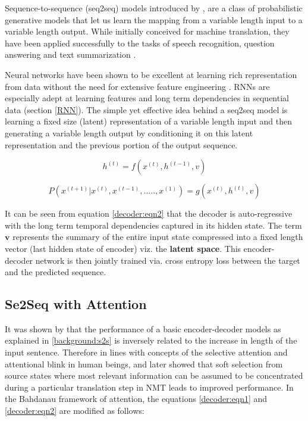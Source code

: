 Sequence-to-sequence (seq2seq) models introduced by \cite{Sutskever2014}, \cite{GRU} are a class of probabilistic generative models that let us learn the mapping from a variable length input to a variable length output. While initially conceived for machine translation, they have been applied successfully to the tasks of speech recognition, question answering and text summarization \citep{Vinyals2015} \citep{anderson2018bottom} \citep{lu2017knowing}.

Neural networks have been shown to be excellent at learning rich representation from data without the need for extensive feature engineering \citep{Hinton2006}. RNNs are especially adept at learning features and long term dependencies in sequential data (section \ref{RNN}). The simple yet effective idea behind a seq2seq model is learning a fixed size (latent) representation of a variable length input and then generating a variable length output by conditioning it on this latent representation and the previous portion of the output sequence.

\begin{equation} \label{decoder:eqn1}
	h^{(t)} = f(x^{(t)}, h^{(t-1)}, v)
\end{equation}

\begin{equation} \label{decoder:eqn2}
	P(x^{(t+1)}|x^{(t)}, x^{(t-1)},.....,x^{(1)}) = g(x^{(t)}, h^{(t)}, v)
\end{equation}

It can be seen from equation \ref{decoder:eqn2} that the decoder is auto-regressive with the long term temporal dependencies captured in its hidden state. The term $\mathbf{v}$ represents the summary of the entire input state compressed into a fixed length vector (last hidden state of encoder) viz. the \textbf{latent space}. This encoder- decoder network is then jointly trained via. cross entropy loss between the target and the predicted sequence.

\subsection{Se2Seq with Attention}\label{mtv:attn}
It was shown by \cite{Cho2014} that the performance of a basic encoder-decoder models as explained in \ref{background:s2s} is inversely related to the increase in length of the input sentence. Therefore in lines with concepts of the selective attention and attentional blink in human beings, \cite{Bahdanau2014} and later  \cite{Luong2015} showed that soft selection from source states where most relevant information can be assumed to be concentrated during a particular translation step in NMT leads to improved performance. In the Bahdanau \citep{Bahdanau2014} framework of attention, the equations \ref{decoder:eqn1} and \ref{decoder:eqn2} are modified as follows:

